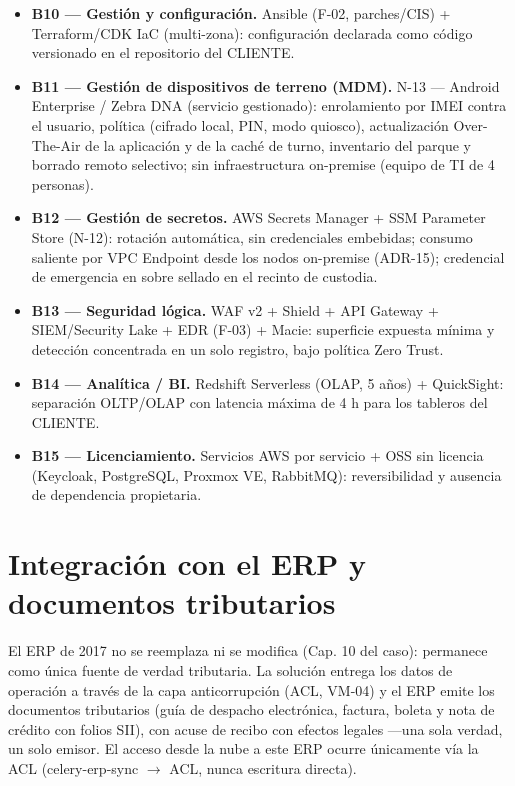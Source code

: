 \begin{itemize}
  \item \textbf{B10 --- Gestión y configuración.} Ansible (F-02, parches/CIS) + Terraform/CDK IaC (multi-zona): configuración declarada como código versionado en el repositorio del CLIENTE.
  \item \textbf{B11 --- Gestión de dispositivos de terreno (MDM).} N-13 --- Android Enterprise / Zebra DNA (servicio gestionado): enrolamiento por IMEI contra el usuario, política (cifrado local, PIN, modo quiosco), actualización Over-The-Air de la aplicación y de la caché de turno, inventario del parque y borrado remoto selectivo; sin infraestructura on-premise (equipo de TI de 4 personas).
  \item \textbf{B12 --- Gestión de secretos.} AWS Secrets Manager + SSM Parameter Store (N-12): rotación automática, sin credenciales embebidas; consumo saliente por VPC Endpoint desde los nodos on-premise (ADR-15); credencial de emergencia en sobre sellado en el recinto de custodia.
  \item \textbf{B13 --- Seguridad lógica.} WAF v2 + Shield + API Gateway + SIEM/Security Lake + EDR (F-03) + Macie: superficie expuesta mínima y detección concentrada en un solo registro, bajo política Zero Trust.
  \item \textbf{B14 --- Analítica / BI.} Redshift Serverless (OLAP, 5 años) + QuickSight: separación OLTP/OLAP con latencia máxima de 4 h para los tableros del CLIENTE.
  \item \textbf{B15 --- Licenciamiento.} Servicios AWS por servicio + OSS sin licencia (Keycloak, PostgreSQL, Proxmox VE, RabbitMQ): reversibilidad y ausencia de dependencia propietaria.
\end{itemize}

\section{Integración con el ERP y documentos tributarios}
\label{sub:integracion-con-el-erp-y-documentos-tribut}

El ERP de 2017 no se reemplaza ni se modifica (Cap. 10 del caso): permanece como única fuente de verdad tributaria. La solución entrega los datos de operación a través de la capa anticorrupción (ACL, VM-04) y el ERP emite los documentos tributarios (guía de despacho electrónica, factura, boleta y nota de crédito con folios SII), con acuse de recibo con efectos legales ---una sola verdad, un solo emisor. El acceso desde la nube a este ERP ocurre únicamente vía la ACL (celery-erp-sync $\rightarrow$ ACL, nunca escritura directa).
